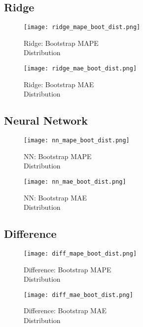 \documentclass[11pt]{article}
\begin{document}
\subsection{Ridge}
\label{appendix:ridge_bootstrap}

\begin{figure}[H]
\centering
\begin{minipage}{.5\textwidth}
  \centering
  \texttt{[image: ridge\_mape\_boot\_dist.png]}
   \caption{Ridge: Bootstrap MAPE \\Distribution}
   \label{fig:ridge_mape_boot_dist}
\end{minipage}%
\begin{minipage}{.5\textwidth}
  \centering
  \texttt{[image: ridge\_mae\_boot\_dist.png]}
   \caption{Ridge: Bootstrap MAE \\Distribution}
   \label{fig:ridge_mae_boot_dist}
\end{minipage}
\end{figure}

\subsection{Neural Network}
\label{appendix:nn_bootstrap}

\begin{figure}[H]
\centering
\begin{minipage}{.5\textwidth}
  \centering
  \texttt{[image: nn\_mape\_boot\_dist.png]}
   \caption{NN: Bootstrap MAPE \\Distribution}
   \label{fig:nn_mape_boot_dist}
\end{minipage}%
\begin{minipage}{.5\textwidth}
  \centering
  \texttt{[image: nn\_mae\_boot\_dist.png]}
   \caption{NN: Bootstrap MAE \\Distribution}
   \label{fig:nn_mae_boot_dist}
\end{minipage}
\end{figure}

\subsection{Difference}
\label{appendix:difference_bootstrap}

\begin{figure}[H]
\centering
\begin{minipage}{.5\textwidth}
  \centering
  \texttt{[image: diff\_mape\_boot\_dist.png]}
   \caption{Difference: Bootstrap MAPE \\Distribution}
   \label{fig:diff_mape_boot_dist}
\end{minipage}%
\begin{minipage}{.5\textwidth}
  \centering
  \texttt{[image: diff\_mae\_boot\_dist.png]}
   \caption{Difference: Bootstrap MAE \\Distribution}
   \label{fig:diff_mae_boot_dist}
\end{minipage}
\end{figure}
\end{document}
